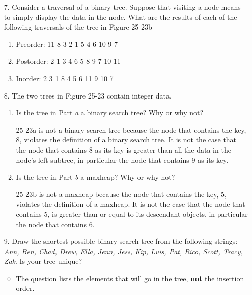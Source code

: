 \documentclass[10pt]{article}
\begin{document}
\begin{enumerate}
	\item[7.] Consider a traversal of a binary tree. Suppose that visiting a node means to simply display the data in the node. What are the results of each of the following traversals of the tree in Figure 25-23b
		\begin{enumerate}
			\item Preorder: 11 8 3 2 1 5 4 6 10 9 7
			
			\item Postorder: 2 1 3 4 6 5 8 9 7 10 11
			
			\item Inorder: 2 3 1 8 4 5 6 11 9 10 7
		\end{enumerate}
	
	\item[8.] The two trees in Figure 25-23 contain integer data.
		\begin{enumerate}
			\item Is the tree in Part \textit{a} a binary search tree? Why or why not?
				
				\vspace{0.5cm}
				25-23a is not a binary search tree because the node that contains the key, 8, violates the definition of a binary search tree. It is not the case that the node that contains 8 as its key is greater than all the data in the node's left subtree, in particular the node that contains 9 as its key.
				\vspace{0.5cm}
			
			\item Is the tree in Part \textit{b} a maxheap? Why or why not?
				
				\vspace{0.5cm}
				25-23b is not a maxheap because the node that contains the key, 5, violates the definition of a maxheap. It is not the case that the node that contains 5, is greater than or equal to its descendant objects, in particular the node that contains 6.
				\vspace{0.5cm}
		\end{enumerate}
	
	\item[9.] Draw the shortest possible binary search tree from the following strings: \textit{Ann, Ben, Chad, Drew, Ella, Jenn, Jess, Kip, Luis, Pat, Rico, Scott, Tracy, Zak}. Is your tree unique?
		\begin{itemize}
			\item The question lists the elements that will go in the tree, \textbf{not} the insertion order.
		\end{itemize}
		

\end{enumerate}
\end{document}

